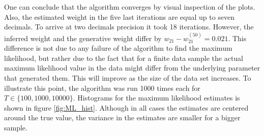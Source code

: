 One can conclude that the algorithm converges by visual inspection of the plots. Also, the estimated weight in the five last iterations are equal up to seven decimals. To arrive at two decimals precision it took 18 iterations. However, the inferred weight and the generative weight differ by $w_{21} - w_{21}^{(50)} = 0.021$. This difference is not due to any failure of the algorithm to find the maximum likelihood, but rather due to the fact that for a finite data sample the actual maximum likelihood value in the data might differ from the underlying parameter that generated them. This will improve as the size of the data set increases. To illustrate this point, the algorithm was run 1000 times each for $T \in \{ 100,1000,10000\}$. Histograms for the maximum likelihood estimates is shown in figure \ref{fig:ML_hist}. Although in all cases the estimates are centered around the true value,  the variance in the estimates are smaller for a bigger sample. 

